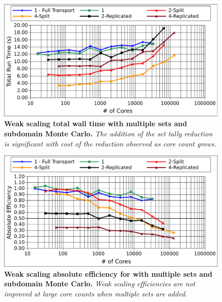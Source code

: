 \begin{figure}[t!]
  \begin{center}
    \includegraphics[width=6in]{chapters/parallel_mc/titan_weak_subdomain_ms_time.pdf}
  \end{center}
  \caption{\textbf{Weak scaling total wall time with multiple sets and
      subdomain Monte Carlo.} \textit{The addition of the set tally
      reduction is significant with cost of the reduction observed as
      core count grows.}}
  \label{fig:titan_weak_subdomain_ms_time}
\end{figure}

\begin{figure}[t!]
  \begin{center}
    \includegraphics[width=6in]{chapters/parallel_mc/titan_weak_subdomain_ms.pdf}
  \end{center}
  \caption{\textbf{Weak scaling absolute efficiency for with multiple
      sets and subdomain Monte Carlo.} \textit{Weak scaling
      efficiencies are not improved at large core counts when multiple
      sets are added.}}
  \label{fig:titan_weak_subdomain_ms}
\end{figure}
